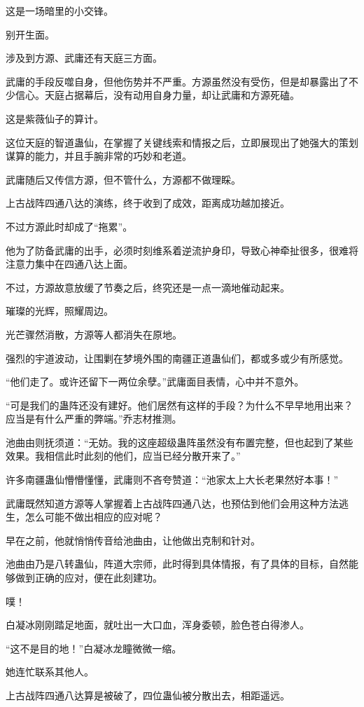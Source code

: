 \begin{this_body}
这是一场暗里的小交锋。

别开生面。

涉及到方源、武庸还有天庭三方面。

武庸的手段反噬自身，但他伤势并不严重。方源虽然没有受伤，但是却暴露出了不少信心。天庭占据幕后，没有动用自身力量，却让武庸和方源死磕。

这是紫薇仙子的算计。

这位天庭的智道蛊仙，在掌握了关键线索和情报之后，立即展现出了她强大的策划谋算的能力，并且手腕非常的巧妙和老道。

武庸随后又传信方源，但不管什么，方源都不做理睬。

上古战阵四通八达的演练，终于收到了成效，距离成功越加接近。

不过方源此时却成了“拖累”。

他为了防备武庸的出手，必须时刻维系着逆流护身印，导致心神牵扯很多，很难将注意力集中在四通八达上面。

不过，方源故意放缓了节奏之后，终究还是一点一滴地催动起来。

璀璨的光辉，照耀周边。

光芒骤然消散，方源等人都消失在原地。

强烈的宇道波动，让围剿在梦境外围的南疆正道蛊仙们，都或多或少有所感觉。

“他们走了。或许还留下一两位余孽。”武庸面目表情，心中并不意外。

“可是我们的蛊阵还没有建好。他们居然有这样的手段？为什么不早早地用出来？应当是有什么严重的弊端。”乔志材推测。

池曲由则抚须道：“无妨。我的这座超级蛊阵虽然没有布置完整，但也起到了某些效果。我相信此时此刻的他们，应当已经分散开来了。”

许多南疆蛊仙懵懵懂懂，武庸则不吝夸赞道：“池家太上大长老果然好本事！”

武庸既然知道方源等人掌握着上古战阵四通八达，也预估到他们会用这种方法逃生，怎么可能不做出相应的应对呢？

早在之前，他就悄悄传音给池曲由，让他做出克制和针对。

池曲由乃是八转蛊仙，阵道大宗师，此时得到具体情报，有了具体的目标，自然能够做到正确的应对，便在此刻建功。

噗！

白凝冰刚刚踏足地面，就吐出一大口血，浑身委顿，脸色苍白得渗人。

“这不是目的地！”白凝冰龙瞳微微一缩。

她连忙联系其他人。

上古战阵四通八达算是被破了，四位蛊仙被分散出去，相距遥远。


\end{this_body}
